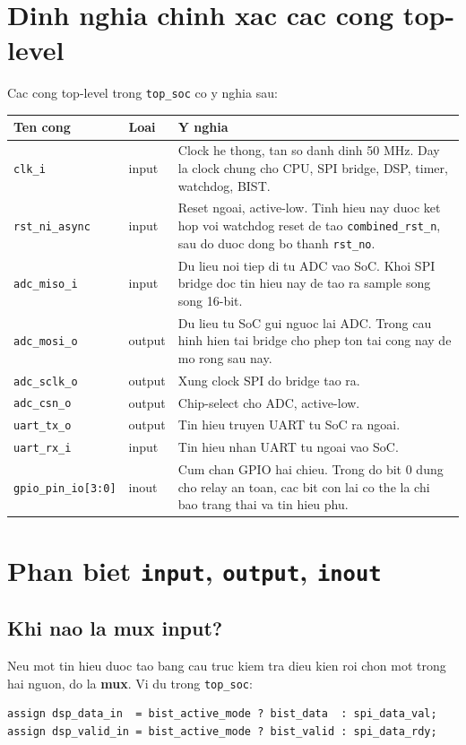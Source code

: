\documentclass[12pt,a4paper]{article}
\begin{document}
\section{Dinh nghia chinh xac cac cong top-level}
Cac cong top-level trong \texttt{top\_soc} co y nghia sau:

\begin{longtable}{>{\ttfamily}p{3cm} p{1.8cm} p{9.2cm}}
\toprule
\textnormal{Ten cong} & \textnormal{Loai} & \textnormal{Y nghia} \\
\midrule
\endhead
\texttt{clk\_i} & input & Clock he thong, tan so danh dinh 50 MHz. Day la clock chung cho CPU, SPI bridge, DSP, timer, watchdog, BIST. \\
\texttt{rst\_ni\_async} & input & Reset ngoai, active-low. Tinh hieu nay duoc ket hop voi watchdog reset de tao \texttt{combined\_rst\_n}, sau do duoc dong bo thanh \texttt{rst\_no}. \\
\texttt{adc\_miso\_i} & input & Du lieu noi tiep di tu ADC vao SoC. Khoi SPI bridge doc tin hieu nay de tao ra sample song song 16-bit. \\
\texttt{adc\_mosi\_o} & output & Du lieu tu SoC gui nguoc lai ADC. Trong cau hinh hien tai bridge cho phep ton tai cong nay de mo rong sau nay. \\
\texttt{adc\_sclk\_o} & output & Xung clock SPI do bridge tao ra. \\
\texttt{adc\_csn\_o} & output & Chip-select cho ADC, active-low. \\
\texttt{uart\_tx\_o} & output & Tin hieu truyen UART tu SoC ra ngoai. \\
\texttt{uart\_rx\_i} & input & Tin hieu nhan UART tu ngoai vao SoC. \\
\texttt{gpio\_pin\_io[3:0]} & inout & Cum chan GPIO hai chieu. Trong do bit 0 dung cho relay an toan, cac bit con lai co the la chi bao trang thai va tin hieu phu. \\
\bottomrule
\end{longtable}

\section{Phan biet \texttt{input}, \texttt{output}, \texttt{inout}}
\subsection{Khi nao la mux input?}
Neu mot tin hieu duoc tao bang cau truc kiem tra dieu kien roi chon mot trong hai nguon, do la \textbf{mux}. Vi du trong \texttt{top\_soc}:
\begin{lstlisting}[style=svstyle]
assign dsp_data_in  = bist_active_mode ? bist_data  : spi_data_val;
assign dsp_valid_in = bist_active_mode ? bist_valid : spi_data_rdy;
\end{lstlisting}
\end{document}
